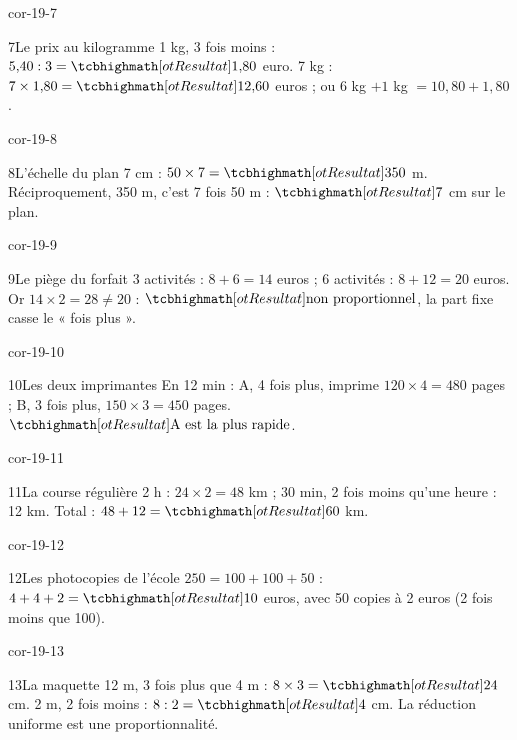 \begin{blocLivre}{cor-19-7}\begin{corrige}{7}{Le prix au kilogramme}
1 kg, 3 fois moins : $5{,}40:3=\res{1{,}80}$ euro. 7 kg : $7\times1{,}80=\res{12{,}60}$ euros ; ou $6$ kg $+1$ kg $=10{,}80+1{,}80$.
\end{corrige}\end{blocLivre}
\begin{blocLivre}{cor-19-8}\begin{corrige}{8}{L’échelle du plan}
7 cm : $50\times7=\res{350}$ m. Réciproquement, 350 m, c’est 7 fois 50 m : $\res7$ cm sur le plan.
\end{corrige}\end{blocLivre}
\begin{blocLivre}{cor-19-9}\begin{corrige}{9}{Le piège du forfait}
3 activités : $8+6=14$ euros ; 6 activités : $8+12=20$ euros. Or $14\times2=28\ne20$ : $\res{\text{non proportionnel}}$, la part fixe casse le « fois plus ».
\end{corrige}\end{blocLivre}
\begin{blocLivre}{cor-19-10}\begin{corrige}{10}{Les deux imprimantes}
En 12 min : A, 4 fois plus, imprime $120\times4=480$ pages ; B, 3 fois plus, $150\times3=450$ pages. $\res{\text{A est la plus rapide}}$.
\end{corrige}\end{blocLivre}
\begin{blocLivre}{cor-19-11}\begin{corrige}{11}{La course régulière}
2 h : $24\times2=48$ km ; 30 min, 2 fois moins qu’une heure : 12 km. Total : $48+12=\res{60}$ km.
\end{corrige}\end{blocLivre}
\begin{blocLivre}{cor-19-12}\begin{corrige}{12}{Les photocopies de l’école}
$250=100+100+50$ : $4+4+2=\res{10}$ euros, avec 50 copies à 2 euros (2 fois moins que 100).
\end{corrige}\end{blocLivre}
\begin{blocLivre}{cor-19-13}\begin{corrige}{13}{La maquette}
12 m, 3 fois plus que 4 m : $8\times3=\res{24}$ cm. 2 m, 2 fois moins : $8:2=\res4$ cm. La réduction uniforme est une proportionnalité.
\end{corrige}\end{blocLivre}
